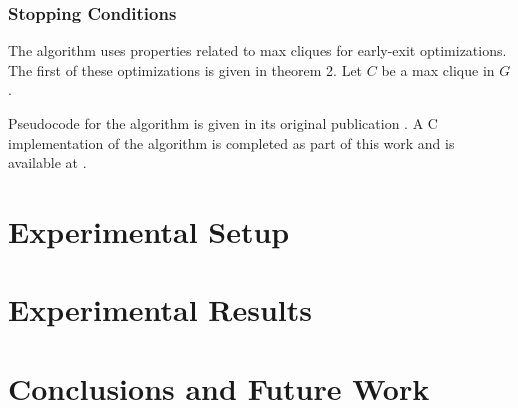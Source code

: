 \documentclass[12pt,conference]{IEEEtran}
\theoremstyle{plain}
\begin{document}
\begin{algorithm}[H]

\end{algorithm}


\subsubsection{Stopping Conditions}

The algorithm uses properties related to max cliques for early-exit optimizations. The first of these optimizations is given in theorem 2. Let $C$ be a max clique in $G$.

Pseudocode for the algorithm is given in its original publication \cite{bodlaender-2012}. A C implementation of the algorithm is completed as part of this work and is available at \cite{project-github}.


\section{Experimental Setup}


\section{Experimental Results}


\section{Conclusions and Future Work}

\end{document}
